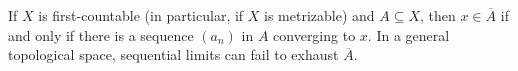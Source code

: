 
If $X$ is first-countable (in particular, if $X$ is metrizable) and $A\subseteq X$, then $x\in\overline A$ if and only if there is a sequence $(a_n)$ in $A$ converging to $x$. In a general topological space, sequential limits can fail to exhaust $\overline A$.
